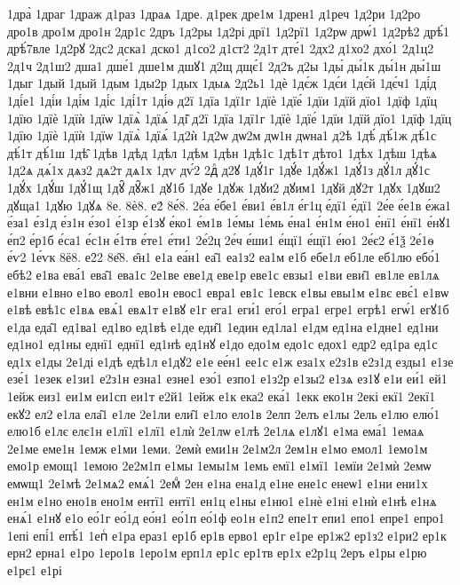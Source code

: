 {1дра̀
1драг
1драж
д1раз
1драѧ
1дре.
д1рек
дре1м
1дрен1
д1реч
1д2ри
1д2ро
дро1в
дро1м
дро1н
2др1с
2дръ
1д2ры
1д2рі
дрї1
1д2рї1
1д2рѡ
дрѡ́1
1д2рѣ2
дрѣ́1
дрѣ́7вле
1д2рꙋ
2дс2
дска1
дско1
д1со2
д1ст2
2д1т
дте́1
2дх2
д1хо2
дхо́1
2д1ц2
2д1ч
2д1ш2
дша1
дше́1
дше1м
дшꙋ1
д2щ
дщє́1
2д2ъ
д2ы
1ды́
ды́1к
ды́1н
ды́1ш
1дыг
1дый
1дый
1дым
1ды2р
1дых
1дыѧ
2д2ь1
1дѐ
1дє́ж
1дє́и
1дє́й
1дє́ч1
1ді́д
1ді́е1
1ді́и
1ді́м
1ді́с
1ді́1т
1ді́ѳ
д2ї
1дїа
1дї1г
1дїѐ
1дїе́
1дїи
1дїй
дїо1
1дїф
1дїц
1дїю
1дїѐ
1дїѝ
1дїѡ
1дїѧ̀
1дїѧ́
1ді̑
д2ї
1дїа
1дї1г
1дїѐ
1дїе́
1дїи
1дїй
дїо1
1дїф
1дїц
1дїю
1дїѐ
1дїѝ
1дїѡ
1дїѧ̀
1дїѧ́
1д2ѝ
1д2ѡ
дѡ2м
дѡ1н
дѡна1
д2ѣ
1дѣ́
дѣ́1ж
дѣ́1с
дѣ́1т
дѣ́1ш
1дѣ̑
1дѣв
1дѣд
1дѣл
1дѣм
1дѣн
1дѣ1с
1дѣ1т
дѣто1
1дѣх
1дѣш
1дѣѧ
1д2ѧ
дѧ́1х
дѧз2
дѧ2т
дѧ1х
1дѵ
дѵ́2
2дⷧ
д2ꙋ
1дꙋ́1г
1дꙋ́е
1дꙋ́ж1
1дꙋ́1з
дꙋ́1л
дꙋ́1с
1дꙋ́х
1дꙋ́ш
1дꙋ́1щ
1дꙋ̑
дꙋ̑ж1
дꙋ1б
1дꙋе
1дꙋж
1дꙋи2
дꙋим1
1дꙋй
дꙋ2т
1дꙋх
1дꙋш2
дꙋща1
1дꙋю
1дꙋѧ
8е.
8ѐ8.
е2́
8е́8.
2е́а
е́бе1
е́ви1
е́в1л
е́г1ц
е́дї1
е́дї1
2е́е
е́е1в
е́жа1
е́за1
е́з1д
е́з1н
е́зо1
е́1зр
е́1зꙋ
е́ко1
е́м1в
1е́мы
1е́мь
е́на1
е́н1м
е́но1
е́нї1
е́нї1
е́нꙋ1
е́п2
е́р1б
е́са1
е́с1н
е́1тв
е́те1
е́ти1
2е́2ц
2е́ч
е́ши1
е́щї1
е́щї1
е́ю1
2е́є2
е́1ѯ
2е́1ѳ
е́ѵ2
1е́ѵк
8ё8.
е2̑2
8е̑8.
е̑н1
е1а
еа́н1
еа̑1
еа1з2
еа1м
е1б
ебе1л
еб1ле
еб1лю
ебо́1
ебѣ2
е1ва
ева́1
ева̑1
ева1с
2е1ве
еве1д
еве1р
еве1с
евзы1
е1ви
еви̑1
ев1ле
ев1лѧ
е1вни
е1вно
е1во
евол1
ево1н
евос1
евра1
ев1с
1евск
е1вы
евы1м
е1вє
евє́1
е1вѡ
е1вѣ
евѣ1с
е1вѧ
евѧ́1
евѧ1т
е1вꙋ
е1г
ега1
еги́1
его́1
егра1
егре1
егрѣ1
егѡ́1
егꙋ1б
е1да
еда̑1
ед1ва1
ед1во
ед1вѣ
е1де
еди̑1
1един
ед1ла1
е1дм
ед1на
е1дне1
ед1ни
ед1но1
ед1ны
еднї1
еднї1
ед1нѣ
ед1нꙋ
е1до
едо1м
едо1с
едох1
едр2
ед1ра
ед1с
ед1х
е1ды
2е1ді
е1дѣ
едѣ1л
е1дꙋ2
е1е
ее́н1
ее1с
е1ж
еза1х
е2з1в
е2з1д
езды1
е1зе
езе́1
1езек
е1зи1
е2з1н
езна1
езне1
езо́1
езпо1
е1з2р
е1зы2
е1зѧ
ез1ꙋ
е1и
еи́1
ей1
1ейж
еиз1
еи1м
еи1сп
еи1т
е2й1
1ейж
е1к
ека2
ека́1
1екк
еко1н
2екі
екї1
2екї1
екꙋ2
ел2
е1ла
ела̑1
е1ле
2е1ли
ели̑1
е1ло
ело1в
2елп
2елъ
е1лы
2ель
е1лю
елю́1
елю1б
е1лє
елє1н
е1лї1
е1лї1
е1лѝ
2е1лѡ
е1лѣ
2е1лѧ
е1лꙋ1
е1ма
ема́1
1емаѧ
2е1ме
еме1н
1емж
е1ми
1еми.
2емѝ
еми1н
2е1м2л
2ем1н
е1мо
емол1
1емо1м
емо1р
емощ1
1емою
2е2м1п
е1мы
1емы1м
1емь
емї1
е1мї1
1емїи
2е1мѝ
2емѡ
емѡщ1
2е1мѣ
2е1мѧ2
емѧ́1
2емⷣ
2ен
е1на
ена1д
е1не
ене1с
енеѡ1
е1ни
ени1х
ен1м
е1но
ено1в
ено1м
ентї1
ентї1
ен1ц
е1ны
е1ню1
е1нѐ
е1ні
е1нѝ
е1нѣ
е1нѧ
енѧ́1
е1нꙋ
е1о
ео́1г
ео́1д
ео́н1
ео́1п
ео́1ф
ео1н
е1п2
епе1т
епи1
епо1
епре1
епро1
1епі
епі́1
епѣ́1
1епⷭ
е1ра
ераз1
ер1б
ер1в
ерво1
ер1г
е1ре
ер1ж2
ер1з2
е1ри2
ер1к
ерн2
ерна1
е1ро
1еро1в
1еро1м
ерп1л
ер1с
ер1тв
ер1х
е2р1ц
2еръ
е1ры
е1рю
е1рє1
е1рі
}
